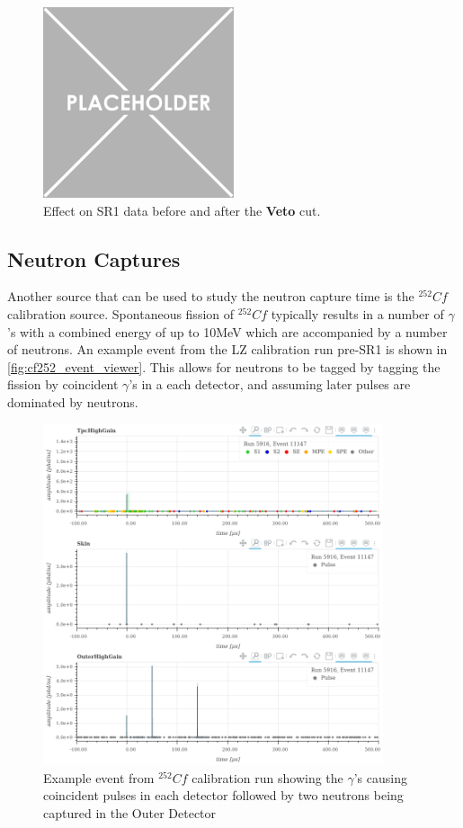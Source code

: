 


\begin{figure}[!htbp]
    \centering
    \includegraphics[width=0.5\textwidth]{Figures/Placeholder.png}
    \caption{Effect on SR1 data before and after the \textbf{Veto} cut.}
    \label{fig:tpc_with_od_veto_in_sr1}
\end{figure}



\subsection{Neutron Captures}
\par
Another source that can be used to study the neutron capture time is the ${}^{252}{Cf}$ calibration source.
Spontaneous fission of ${}^{252}{Cf}$ typically results in a number of $\gamma$'s with a combined energy of up to 10MeV which are accompanied by a number of neutrons.
An example event from the LZ calibration run pre-SR1 is shown in \autoref{fig:cf252_event_viewer}.
This allows for neutrons to be tagged by tagging the fission by coincident $\gamma$'s in a each detector, and assuming later pulses are dominated by neutrons.

\begin{figure}[!htbp]
\includegraphics[width=10cm]{Figures/NeutronCaptureTime/cf252_eventviewer_5916.png}
\centering
\caption{Example event from ${}^{252}{Cf}$ calibration run showing the $\gamma$'s causing coincident pulses in each detector followed by two neutrons being captured in the Outer Detector}
\label{fig:cf252_event_viewer}
\end{figure}

